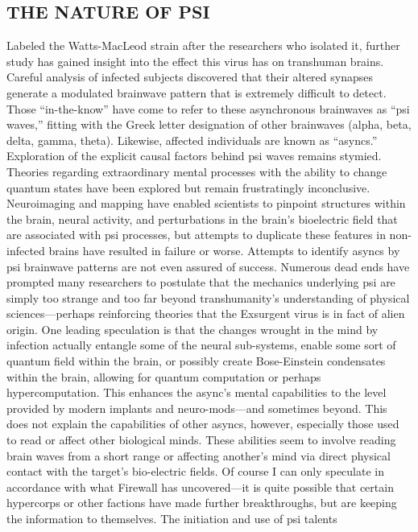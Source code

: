 \subsection{THE NATURE OF PSI}
Labeled the Watts-MacLeod strain
after the researchers who isolated it,
further study has gained insight into
the effect this virus has on transhuman
brains. Careful analysis of infected
subjects discovered that their altered
synapses generate a modulated brainwave
pattern that is extremely difficult
to detect. Those “in-the-know” have
come to refer to these asynchronous
brainwaves as “psi waves,” fitting with
the Greek letter designation of other
brainwaves (alpha, beta, delta, gamma,
theta). Likewise, affected individuals are
known as “asyncs.”
Exploration of the explicit causal factors
behind psi waves remains stymied.
Theories regarding extraordinary mental
processes with the ability to change
quantum states have been explored but
remain frustratingly inconclusive. Neuroimaging
and mapping have enabled
scientists to pinpoint structures within
the brain, neural activity, and perturbations
in the brain’s bioelectric field that
are associated with psi processes, but
attempts to duplicate these features
in non-infected brains have resulted in
failure or worse. Attempts to identify
asyncs by psi brainwave patterns are not
even assured of success. Numerous dead
ends have prompted many researchers to
postulate that the mechanics underlying
psi are simply too strange and too far
beyond transhumanity’s understanding
of physical sciences—perhaps reinforcing
theories that the Exsurgent virus is in
fact of alien origin.
One leading speculation is that the
changes wrought in the mind by infection
actually entangle some of the
neural sub-systems, enable some sort of
quantum field within the brain, or possibly
create Bose-Einstein condensates
within the brain, allowing for quantum
computation or perhaps hypercomputation.
This enhances the async’s mental
capabilities to the level provided by
modern implants and neuro-mods—and
sometimes beyond. This does not explain
the capabilities of other asyncs, however,
especially those used to read or affect
other biological minds. These abilities
seem to involve reading brain waves
from a short range or affecting another’s
mind via direct physical contact with the
target’s bio-electric fields. Of course I can
only speculate in accordance with what
Firewall has uncovered—it is quite possible
that certain hypercorps or other factions
have made further breakthroughs,
but are keeping the information to
themselves.
The initiation and use of psi talents
